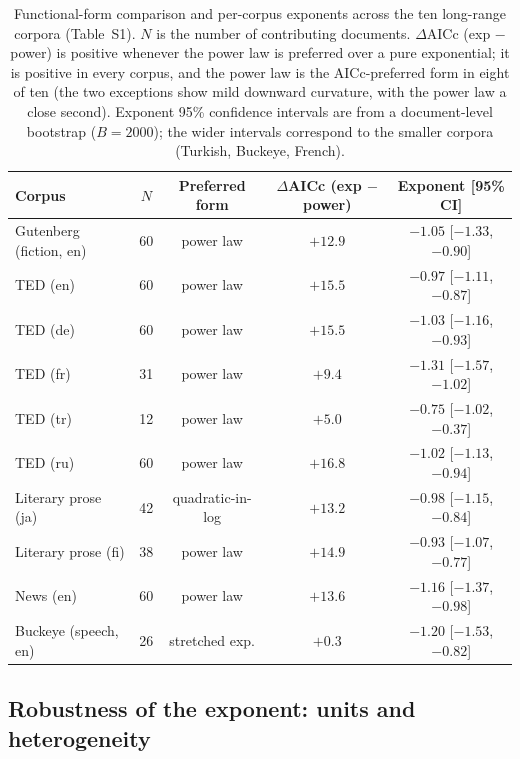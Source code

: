 \documentclass[11pt]{article}
\begin{document}
\renewcommand{\thetable}{S1}
\begin{table}[h]
\centering
\small
\begin{tabular}{lcccc}
\toprule
Corpus & $N$ & Preferred form & $\Delta$AICc (exp $-$ power) & Exponent [95\% CI] \\
\midrule
Gutenberg (fiction, en) & 60 & power law & $+12.9$ & $-1.05$ [$-1.33$, $-0.90$] \\
TED (en)                & 60 & power law & $+15.5$ & $-0.97$ [$-1.11$, $-0.87$] \\
TED (de)                & 60 & power law & $+15.5$ & $-1.03$ [$-1.16$, $-0.93$] \\
TED (fr)                & 31 & power law & $+9.4$  & $-1.31$ [$-1.57$, $-1.02$] \\
TED (tr)                & 12 & power law & $+5.0$  & $-0.75$ [$-1.02$, $-0.37$] \\
TED (ru)                & 60 & power law & $+16.8$ & $-1.02$ [$-1.13$, $-0.94$] \\
Literary prose (ja)     & 42 & quadratic-in-log & $+13.2$ & $-0.98$ [$-1.15$, $-0.84$] \\
Literary prose (fi)     & 38 & power law & $+14.9$ & $-0.93$ [$-1.07$, $-0.77$] \\
News (en)               & 60 & power law & $+13.6$ & $-1.16$ [$-1.37$, $-0.98$] \\
Buckeye (speech, en)    & 26 & stretched exp. & $+0.3$ & $-1.20$ [$-1.53$, $-0.82$] \\
\bottomrule
\end{tabular}
\caption{Functional-form comparison and per-corpus exponents across the ten long-range corpora
(Table~S1). $N$ is the number of contributing documents. $\Delta$AICc (exp $-$ power) is positive
whenever the power law is preferred over a pure exponential; it is positive in every corpus, and the
power law is the AICc-preferred form in eight of ten (the two exceptions show mild downward curvature,
with the power law a close second). Exponent 95\% confidence intervals are from a document-level
bootstrap ($B=2000$); the wider intervals correspond to the smaller corpora (Turkish, Buckeye, French).}
\end{table}

\subsection*{Robustness of the exponent: units and heterogeneity}
\end{document}
